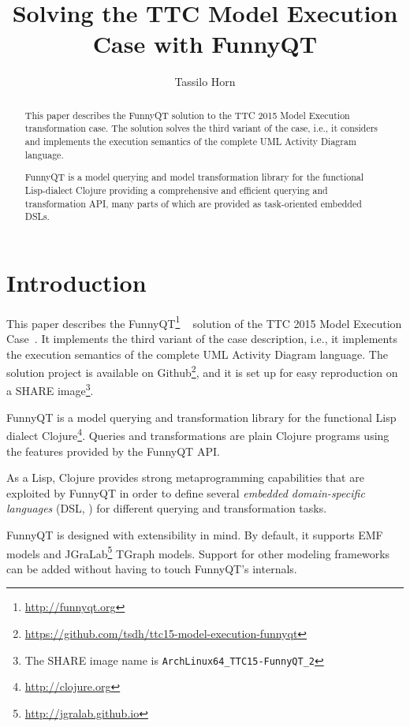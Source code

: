 \documentclass[submission]{eptcs}
\title{Solving the TTC Model Execution Case with FunnyQT}
\author{Tassilo Horn
  \institute{Institute for Software Technology, University Koblenz-Landau, Germany}
  \email{horn@uni-koblenz.de}}
\begin{document}
\maketitle

\begin{abstract}
  This paper describes the FunnyQT solution to the TTC 2015 Model Execution
  transformation case.  The solution solves the third variant of the case,
  i.e., it considers and implements the execution semantics of the complete UML
  Activity Diagram language.

  FunnyQT is a model querying and model transformation library for the
  functional Lisp-dialect Clojure providing a comprehensive and efficient
  querying and transformation API, many parts of which are provided as
  task-oriented embedded DSLs.
\end{abstract}


\section{Introduction}
\label{sec:introduction}

This paper describes the FunnyQT\footnote{\url{http://funnyqt.org}}
~\cite{Horn2013MQWFQ,funnyqt-icgt15} solution of the TTC 2015 Model Execution
Case~\cite{model-execution-case-desc}.  It implements the third variant of the
case description, i.e., it implements the execution semantics of the complete
UML Activity Diagram language.  The solution project is available on
Github\footnote{\url{https://github.com/tsdh/ttc15-model-execution-funnyqt}},
and it is set up for easy reproduction on a SHARE image\footnote{The SHARE
  image name is \verb|ArchLinux64_TTC15-FunnyQT_2|}.

FunnyQT is a model querying and transformation library for the functional Lisp
dialect Clojure\footnote{\url{http://clojure.org}}.  Queries and
transformations are plain Clojure programs using the features provided by the
FunnyQT API.

As a Lisp, Clojure provides strong metaprogramming capabilities that are
exploited by FunnyQT in order to define several \emph{embedded domain-specific
  languages} (DSL, \cite{book:Fowler2010DSL}) for different querying and
transformation tasks.

FunnyQT is designed with extensibility in mind.  By default, it supports EMF
\cite{Steinberg2008EEM} models and
JGraLab\footnote{\url{http://jgralab.github.io}} TGraph models.  Support for
other modeling frameworks can be added without having to touch FunnyQT's
internals.
\end{document}
